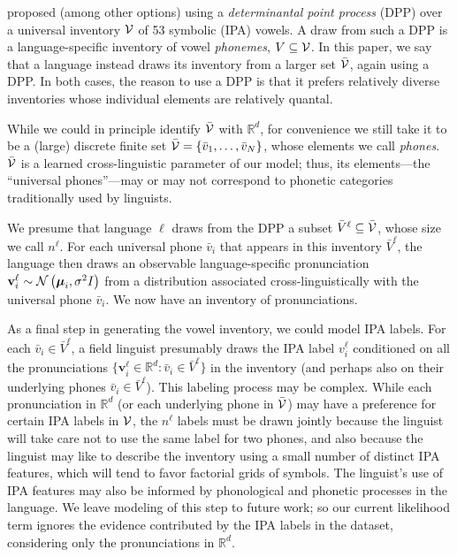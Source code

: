 \documentclass[11pt,a4paper]{article}
\newcommand{\bigV}{{\cal V}}
\newcommand{\bigVbar}{\bar{\bigV}}
\newcommand{\Vbar}{\bar{V}}
\newcommand{\vbar}{\bar{v}}
\renewcommand{\l}{^\ell}
\newcommand{\vmu}{{\boldsymbol \mu}}
\newcommand{\vv}{{\mathbf{v}}}
\begin{document}
 proposed (among other options) using a {\em determinantal point process} (DPP) over a universal inventory $\bigV$ of 53 symbolic (IPA) vowels.  A draw from such a DPP is a language-specific inventory of vowel {\em phonemes}, $V \subseteq \bigV$.  In this paper, we say that a language instead draws its inventory from a larger set $\bigVbar$, again using a DPP.  In both cases, the reason to use a DPP is that it prefers relatively diverse inventories whose individual elements are relatively quantal.

While we could in principle identify $\bigVbar$ with $\mathbb{R}^d$, for convenience we still take it to be a (large) discrete finite set $\bigVbar = \{\vbar_1,\ldots,\vbar_N\}$, whose elements we call {\em phones}. $\bigVbar$ is a learned cross-linguistic parameter of our model; thus, its elements---the ``universal phones''---may or may not correspond to phonetic categories traditionally used by linguists.

We presume that language $\ell$ draws from the DPP a subset $\Vbar\l \subseteq \bigVbar$, whose size we call $n\l$.  For each universal phone $\vbar_i$ that appears in this inventory $\Vbar\l$, the language then draws an observable language-specific pronunciation $\vv\l_i \sim {\cal N}\left(\vmu_i, \sigma^2 I\right)$ from a distribution associated cross-linguistically with the universal phone $\vbar_i$.
We now have an inventory of pronunciations.

As a final step in generating the vowel inventory, we could model IPA labels.  For each $\vbar_i \in \Vbar\l$, a field linguist presumably draws the IPA label $v\l_i$ conditioned on all the pronunciations $\{\vv\l_i \in \mathbb{R}^d: \vbar_i \in \Vbar\l\}$ in the inventory (and perhaps also on their underlying phones $\vbar_i \in\Vbar\l$).  This labeling process may be complex.  While each pronunciation in $\mathbb{R}^d$ (or each underlying phone in $\bigVbar$) may have a preference for certain IPA labels in $\bigV$, the $n\l$ labels must be drawn jointly because the linguist will take care not to use the same label for two phones, and also because the linguist may like to describe the inventory using a small number of distinct IPA features, which will tend to favor factorial grids of symbols.  The linguist's use of IPA features may also be informed by phonological and phonetic processes in the language.  We leave modeling of this step to future work; so our current likelihood term ignores the evidence contributed by the IPA labels in the dataset, considering only the pronunciations in $\mathbb{R}^d$.
\end{document}
